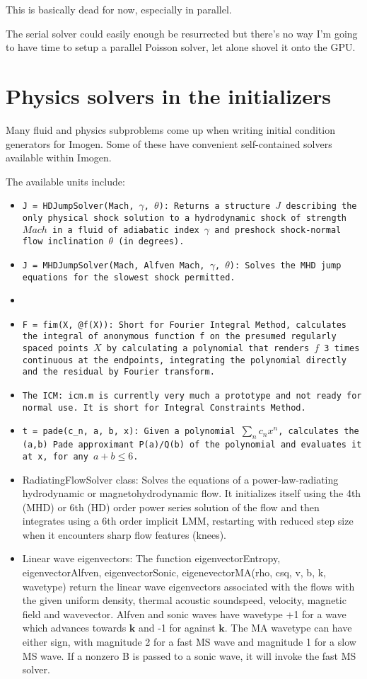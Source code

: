 \documentclass[letterpaper,12pt,twocolumn]{article}
\begin{document}
This is basically dead for now, especially in parallel.

The serial solver could easily enough be resurrected but there's no way I'm going
to have time to setup a parallel Poisson solver, let alone shovel it onto the GPU.

\section{Physics solvers in the initializers}

Many fluid and physics subproblems come up when writing initial condition generators
for Imogen. Some of these have convenient self-contained solvers available within
Imogen.

The available units include:
\begin{itemize}
\item \tt{J = HDJumpSolver(Mach, $\gamma$, $\theta$)}: Returns a structure $J$ describing the
only physical shock solution to a hydrodynamic shock of strength $Mach$ in a fluid of
adiabatic index $\gamma$ and preshock shock-normal flow inclination $\theta$ (in degrees).
\item \tt{J = MHDJumpSolver(Mach, Alfven Mach, $\gamma$, $\theta$)}: Solves the MHD jump
equations for the slowest shock permitted.
\item 
\item \tt{F = fim(X, @f(X))}: Short for Fourier Integral Method, calculates the integral of
anonymous function f on the presumed regularly spaced points $X$ by calculating a polynomial
that renders $f$ 3 times continuous at the endpoints, integrating the polynomial directly
and the residual by Fourier transform.
\item \tt{The ICM}: \tt{icm.m} is currently very much a prototype and not ready for normal use.
It is short for Integral Constraints Method.
\item \tt{t = pade(c\_n, a, b, x)}: Given a polynomial $\sum_n c_n x^n$, calculates the (a,b)
Pade approximant P(a)/Q(b) of the polynomial and evaluates it at x, for any $a+b \le 6$.
\item RadiatingFlowSolver class: Solves the equations of a power-law-radiating hydrodynamic
or magnetohydrodynamic flow. It initializes itself using the 4th (MHD) or 6th (HD) order power
series solution of the flow and then integrates using a 6th order implicit LMM, restarting with
reduced step size when it encounters sharp flow features (knees).
\item Linear wave eigenvectors: The function eigenvectorEntropy, eigenvectorAlfven, eigenvectorSonic,
eigenevectorMA(rho, csq, v, b, k, wavetype) return the linear wave eigenvectors associated with the
flows with the given uniform density, thermal acoustic soundspeed, velocity, magnetic field and wavevector.
Alfven and sonic waves have wavetype +1 for a wave which advances towards $\mathbf{k}$ and -1 for
against $\mathbf{k}$. The MA wavetype can have either sign, with magnitude 2 for a fast MS
wave and magnitude 1 for a slow MS wave. If a nonzero B is passed to a sonic wave, it will invoke the
fast MS solver.
\end{itemize}
\end{document}
